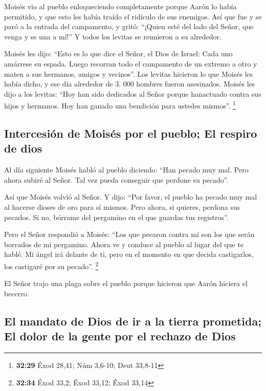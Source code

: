  Moisés vio al pueblo enloqueciendo completamente porque
Aarón lo había permitido, y que esto les había traído el ridículo de sus
enemigos.  Así que fue y se paró a la entrada del
campamento, y gritó: ``¡Quien esté del lado del Señor, que venga y se
una a mí!'' Y todos los levitas se reunieron a su alrededor.

 Moisés les dijo: ``Esto es lo que dice el Señor, el Dios
de Israel: Cada uno amárrese su espada. Luego recorran todo el
campamento de un extremo a otro y maten a sus hermanos, amigos y
vecinos''.  Los levitas hicieron lo que Moisés les había
dicho, y ese día alrededor de 3. 000 hombres fueron asesinados.
 Moisés les dijo a los levitas: ``Hoy han sido dedicados
al Señor porque hanactuado contra sus hijos y hermanos. Hoy han ganado
una bendición para ustedes mismos''. \footnote{\textbf{32:29} Éxod
  28,41; Núm 3,6-10; Deut 33,8-11}

\hypertarget{intercesiuxf3n-de-moisuxe9s-por-el-pueblo-el-respiro-de-dios}{%
\subsection{Intercesión de Moisés por el pueblo; El respiro de
dios}\label{intercesiuxf3n-de-moisuxe9s-por-el-pueblo-el-respiro-de-dios}}

 Al día siguiente Moisés habló al pueblo diciendo: ``Han
pecado muy mal. Pero ahora subiré al Señor. Tal vez pueda conseguir que
perdone su pecado''.

 Así que Moisés volvió al Señor. Y dijo: ``Por favor, el
pueblo ha pecado muy mal al hacerse dioses de oro para sí mismos.
 Pero ahora, si quieres, perdona sus pecados. Si no,
bórrame del pergamino en el que guardas tus registros''.

 Pero el Señor respondió a Moisés: ``Los que pecaron
contra mí son los que serán borrados de mi pergamino. 
Ahora ve y conduce al pueblo al lugar del que te hablé. Mi ángel irá
delante de ti, pero en el momento en que decida castigarlos, los
castigaré por su pecado''. \footnote{\textbf{32:34} Éxod 33,2; Éxod
  33,12; Éxod 33,14}

 El Señor trajo una plaga sobre el pueblo porque hicieron
que Aarón hiciera el becerro.

\hypertarget{el-mandato-de-dios-de-ir-a-la-tierra-prometida-el-dolor-de-la-gente-por-el-rechazo-de-dios}{%
\subsection{El mandato de Dios de ir a la tierra prometida; El dolor de
la gente por el rechazo de
Dios}\label{el-mandato-de-dios-de-ir-a-la-tierra-prometida-el-dolor-de-la-gente-por-el-rechazo-de-dios}}

